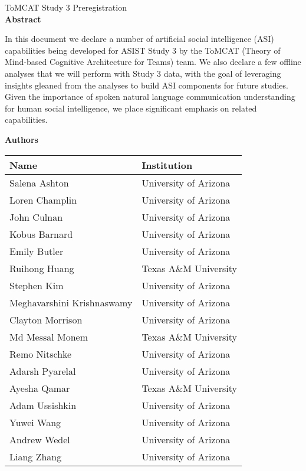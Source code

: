 \documentclass[oneside,9pt]{memoir}
\begin{document}
\thispagestyle{empty}
\begin{center}
    {\LARGE ToMCAT Study 3 Preregistration}\\
    \bigskip
    \textbf{Abstract}
\end{center}

    In this document we declare a number of artificial social intelligence
    (ASI) capabilities being developed for ASIST Study 3 by the ToMCAT (Theory
    of Mind-based Cognitive Architecture for Teams) team. We also declare a few
    offline analyses that we will perform with Study 3 data, with the goal of
    leveraging insights gleaned from the analyses to build ASI components for
    future studies. Given the importance of spoken natural language
    communication understanding for human social intelligence, we place
    significant emphasis on related capabilities.

\begin{center}

    \bigskip

    \textbf{Authors}

    \bigskip

    \begin{tabular}{ll}
        \toprule
        Name & Institution \\\midrule
        Salena Ashton & University of Arizona\\
        Loren Champlin & University of Arizona\\
        John Culnan & University of Arizona\\
        Kobus Barnard & University of Arizona\\
        Emily Butler & University of Arizona\\
        Ruihong Huang & Texas A\&M University \\
        Stephen Kim & University of Arizona\\
        Meghavarshini Krishnaswamy & University of Arizona\\
        Clayton Morrison & University of Arizona\\
        Md Messal Monem & Texas A\&M University \\
        Remo Nitschke & University of Arizona\\
        Adarsh Pyarelal & University of Arizona\\
        Ayesha Qamar & Texas A\&M University \\
        Adam Ussishkin& University of Arizona\\
        Yuwei Wang & University of Arizona\\
        Andrew Wedel & University of Arizona\\
        Liang Zhang & University of Arizona\\
        \bottomrule
    \end{tabular}
\end{center}
\end{document}
